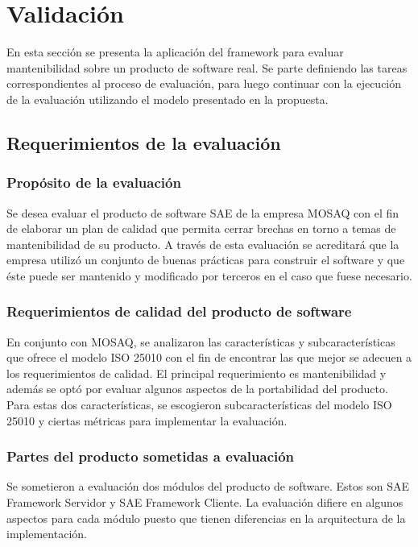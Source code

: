 \chapter{Validación}

En esta sección se presenta la aplicación del framework para evaluar mantenibilidad
sobre un producto de software real. Se parte definiendo las tareas correspondientes
al proceso de evaluación, para luego continuar con la ejecución de la evaluación
utilizando el modelo presentado en la propuesta.

\section{Requerimientos de la evaluación}

\subsection{Propósito de la evaluación}

Se desea evaluar el producto de software SAE de la empresa MOSAQ con el fin de
elaborar un plan de calidad que permita cerrar brechas en torno a temas de 
mantenibilidad de su producto. A través de esta evaluación se acreditará que la 
empresa utilizó un conjunto de buenas prácticas para construir el software y que 
éste puede ser mantenido y modificado por terceros en el caso que fuese necesario.

\subsection{Requerimientos de calidad del producto de software}

En conjunto con MOSAQ, se analizaron las características y subcaracterísticas que ofrece
el modelo ISO 25010 con el fin de encontrar las que mejor se adecuen a los requerimientos
de calidad. El principal requerimiento es mantenibilidad y además se optó por evaluar
algunos aspectos de la portabilidad del producto. Para estas dos características, se
escogieron subcaracterísticas del modelo ISO 25010 y ciertas métricas para implementar
la evaluación.

\subsection{Partes del producto sometidas a evaluación}

Se sometieron a evaluación dos módulos del producto de software. Estos son SAE Framework
Servidor y SAE Framework Cliente. La evaluación difiere en algunos aspectos para cada módulo
puesto que tienen diferencias en la arquitectura de la implementación.

